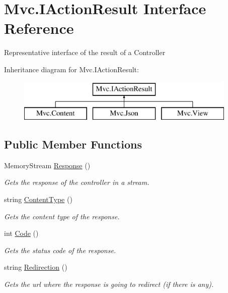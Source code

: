 \hypertarget{interface_mvc_1_1_i_action_result}{}\section{Mvc.\+I\+Action\+Result Interface Reference}
\label{interface_mvc_1_1_i_action_result}


Representative interface of the result of a Controller  


Inheritance diagram for Mvc.\+I\+Action\+Result\+:\begin{figure}[H]
\begin{center}
\leavevmode
\includegraphics[height=2.000000cm]{interface_mvc_1_1_i_action_result}
\end{center}
\end{figure}
\subsection*{Public Member Functions}
\begin{DoxyCompactItemize}
\item 
Memory\+Stream \hyperlink{interface_mvc_1_1_i_action_result_a7cf7423071384c7b2bac75a5f4d6e25c}{Response} ()
\begin{DoxyCompactList}\small\item\em Gets the response of the controller in a stream. \end{DoxyCompactList}\item 
string \hyperlink{interface_mvc_1_1_i_action_result_a8ad08f29bba90dfbe06d7a00465af10a}{Content\+Type} ()
\begin{DoxyCompactList}\small\item\em Gets the content type of the response. \end{DoxyCompactList}\item 
int \hyperlink{interface_mvc_1_1_i_action_result_ab6b85ae50597587395df99b972c3d26b}{Code} ()
\begin{DoxyCompactList}\small\item\em Gets the status code of the response. \end{DoxyCompactList}\item 
string \hyperlink{interface_mvc_1_1_i_action_result_a036707da116ea300eae90e105b8d1ced}{Redirection} ()
\begin{DoxyCompactList}\small\item\em Gets the url where the response is going to redirect (if there is any). \end{DoxyCompactList}\end{DoxyCompactItemize}


